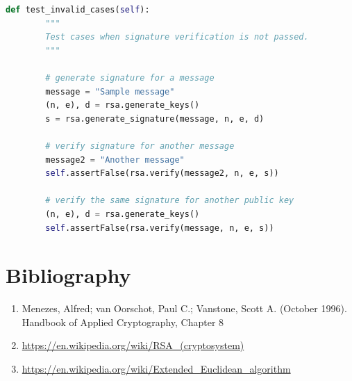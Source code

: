 \documentclass{article}
\begin{document}
\small

\begin{lstlisting}[language=Python]
    def test_invalid_cases(self):
        """
        Test cases when signature verification is not passed.
        """

        # generate signature for a message
        message = "Sample message"
        (n, e), d = rsa.generate_keys()
        s = rsa.generate_signature(message, n, e, d)

        # verify signature for another message
        message2 = "Another message"
        self.assertFalse(rsa.verify(message2, n, e, s))

        # verify the same signature for another public key
        (n, e), d = rsa.generate_keys()
        self.assertFalse(rsa.verify(message, n, e, s))
\end{lstlisting}

\normalsize

\section{Bibliography}
\begin{enumerate}
    \item Menezes, Alfred; van Oorschot, Paul C.; Vanstone, Scott A. (October 1996). Handbook of Applied Cryptography, Chapter 8
    \item \url{https://en.wikipedia.org/wiki/RSA_(cryptosystem)}
    \item \url{https://en.wikipedia.org/wiki/Extended_Euclidean_algorithm}
\end{enumerate}
\end{document}
